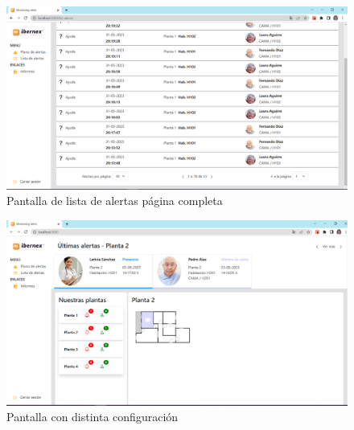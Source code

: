 \begin{landscape}
\begin{figure}[!ht]
    \centering
    \includegraphics[width=25cm]{Imagenes/list-pag1.PNG}
    \caption{Pantalla de lista de alertas página completa}
    \label{fig:list-completa}
\end{figure}

\begin{figure}[!ht]
    \centering
    \includegraphics[width=25cm]{Imagenes/map-alarmas-cambio-conf.PNG}
    \caption{Pantalla con distinta configuración}
    \label{fig:map-configuracion}
\end{figure}
\end{landscape}